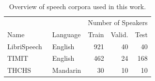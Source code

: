 %
\begin{table}
  \centering
  \caption{Overview of speech corpora used in this work.}%
\label{tab:corpora}
\scriptsize
\begin{tabular}{llrrr}
  \toprule
  & & \multicolumn{3}{c}{Number of Speakers} \\
  \cmidrule(r){3-5}
  Name & Language &  Train & Valid. & Test\\
  \midrule
  LibriSpeech~\cite{panayotov15} & English & 921 & 40 & 40 \\
  TIMIT~\cite{TIMIT93} & English & 462 & 24 & 168 \\
  THCHS~\cite{THCHS15} & Mandarin & 30 & 10 & 10 \\
  \bottomrule
  \end{tabular}
\end{table}

